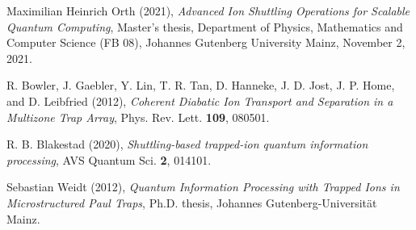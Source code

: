 \documentclass[11pt, a4paper]{article}
\theoremstyle{definition}
\numberwithin{equation}{section}
\begin{document}
\newpage

\begin{thebibliography}{4}

Maximilian Heinrich Orth (2021), \emph{Advanced Ion Shuttling Operations for Scalable Quantum Computing}, Master's thesis, Department of Physics, Mathematics and Computer Science (FB 08), Johannes Gutenberg University Mainz, November 2, 2021.

R. Bowler, J. Gaebler, Y. Lin, T. R. Tan, D. Hanneke, J. D. Jost, J. P. Home, and D. Leibfried (2012),
\emph{Coherent Diabatic Ion Transport and Separation in a Multizone Trap Array},
Phys. Rev. Lett. \textbf{109}, 080501.

R. B. Blakestad (2020),
\emph{Shuttling-based trapped-ion quantum information processing},
AVS Quantum Sci. \textbf{2}, 014101.

Sebastian Weidt (2012),
\emph{Quantum Information Processing with Trapped Ions in Microstructured Paul Traps},
Ph.D. thesis, Johannes Gutenberg-Universität Mainz.

\end{thebibliography}
\end{document}
